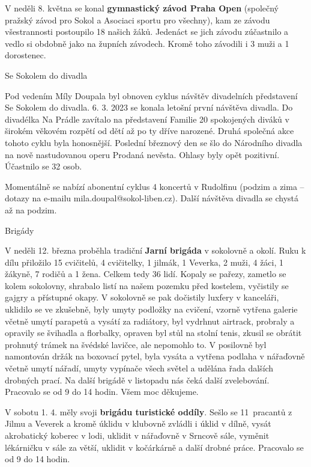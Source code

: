 \documentclass[11pt]{article}
\newcommand{\subpost}[1]{%
\vspace*{12pt}
\begin{center}
{\Large \tyrs #1}
\end{center}}
\begin{document}
V neděli 8. května se konal \textbf{gymnastický závod Praha Open} (společný pražský závod pro Sokol a Asociaci sportu pro všechny), kam ze závodu všestrannosti postoupilo 18 našich žáků. Jedenáct se jich závodu zúčastnilo a vedlo si obdobně jako na župních závodech. Kromě toho závodili i 3 muži a 1 dorostenec.

\subpost{Se Sokolem do divadla}
Pod vedením Míly Doupala byl obnoven cyklus návštěv divadelních představení Se Sokolem do divadla. 6. 3. 2023 se konala letošní první návštěva divadla. Do divadélka Na Prádle zavítalo na představení Familie 20 spokojených diváků v širokém věkovém rozpětí od dětí až po ty dříve narozené. Druhá společná akce tohoto cyklu byla honosnější. Poslední březnový den se šlo do Národního divadla na nově nastudovanou operu Prodaná nevěsta. Ohlasy byly opět pozitivní. Účastnilo se 32 osob.

Momentálně se nabízí abonentní cyklus 4 koncertů v Rudolfinu (podzim a zima – dotazy na e-mailu mila.doupal@sokol-liben.cz). Další návštěva divadla se chystá až na podzim. 

\subpost{Brigády}
V neděli 12. března proběhla tradiční \textbf{Jarní brigáda} v sokolovně a okolí. Ruku k dílu přiložilo 15 cvičitelů, 4 cvičitelky, 1 jilmák, 1 Veverka, 2 muži, 4 žáci, 1 žákyně, 7 rodičů a 1 žena. Celkem tedy 36 lidí. Kopaly se pařezy, zametlo se kolem sokolovny, shrabalo listí na našem pozemku před kostelem, vyčistily se gajgry a přístupné okapy. V sokolovně se pak dočistily luxfery v kanceláři, uklidilo se ve zkušebně, byly umyty podložky na cvičení, vzorně vytřena galerie včetně umytí parapetů a vysátí za radiátory, byl vydrhnut airtrack, probraly a opravily se švihadla a florbalky, opraven byl stůl na stolní tenis, zkusil se obrátit prohnutý trámek na švédské lavičce, ale nepomohlo to. V posilovně byl namontován držák na boxovací pytel, byla vysáta a vytřena podlaha v nářaďovně včetně umytí nářadí, umyty vypínače všech světel a udělána řada dalších drobných prací. Na další brigádě v listopadu nás čeká další zvelebování. Pracovalo se od 9 do 14 hodin. Všem moc děkujeme.

V sobotu 1. 4. měly svoji \textbf{brigádu turistické oddíly}. Sešlo se 11~pracantů z Jilmu a Veverek a kromě úklidu v klubovně zvládli i úklid v dílně, vysát akrobatický koberec v lodi, uklidit v nářaďovně v Srncově sále, vyměnit lékárničku v sále za větší, uklidit v kočárkárně a další drobné práce. Pracovalo se od 9 do 14 hodin.
\end{document}
